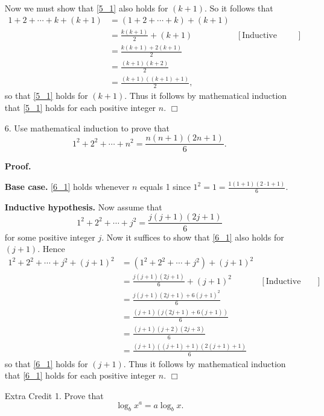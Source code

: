 \documentclass[9pt]{article}
\newcommand{\qed}{\hfill \ensuremath{\Box}}
\newcommand{\D}{\displaystyle}
\begin{document}
\begin{enumerate}
      Now we must show that \eqref{5_1} also holds for $(k+1)$. So it follows
      that
      \begin{align*}
         1 + 2 + \cdots + k + (k+1) &= (1 + 2 + \cdots + k) + (k + 1) \\
            &= \frac{k(k+1)}{2} + (k+1) &[\text{Inductive hypothesis}] \\
            &= \frac{k(k+1)+2(k+1)}{2} \\
            &= \frac{(k+1)(k+2)}{2} \\
            &= \frac{(k+1)((k+1)+1)}{2},
      \end{align*}
      so that \eqref{5_1} holds for $(k+1)$. Thus it follows by mathematical 
      induction that \eqref{5_1} holds for each positive integer $n$. \qed
   \item[6.] Use mathematical induction to prove that
         \begin{equation} \label{6_1}
            1^2 + 2^2 + \cdots + n^2 = \frac{n(n+1)(2n+1)}{6}.
         \end{equation}

      \textbf{Proof.} 

      \textbf{Base case.} \eqref{6_1} holds whenever $n$ equals 1 since
      $1^2 = 1 = \D\frac{1(1+1)(2\cdot1+1)}{6}$.

      \textbf{Inductive hypothesis.} Now assume that
      $$1^2 + 2^2 + \cdots + j^2 = \frac{j(j+1)(2j+1)}{6}$$
      for some positive integer $j$. Now it suffices to show that \eqref{6_1} 
      also holds for $(j+1)$. Hence
      \begin{align*}
         1^2 + 2^2 + \cdots + j^2 + (j+1)^2 &=
            (1^2 + 2^2 + \cdots + j^2) + (j + 1)^2 \\
            &= \frac{j(j+1)(2j+1)}{6} + (j + 1)^2
                  &[\text{Inductive hypothesis}] \\
            &= \frac{j(j+1)(2j+1) + 6(j+1)^2}{6} \\
            &= \frac{(j+1)(j(2j+1)+6(j+1))}{6} \\
            &= \frac{(j+1)(j+2)(2j+3)}{6} \\
            &= \frac{(j+1)((j+1)+1)(2(j+1)+1)}{6}
      \end{align*}
      so that \eqref{6_1} holds for $(j+1)$. Thus it follows by mathematical 
      induction that \eqref{6_1} holds for each positive integer $n$. \qed
\item[Extra Credit 1.] Prove that 
   $$\log_bx^a = a \log_bx.$$
   

\end{enumerate}
\end{document}
